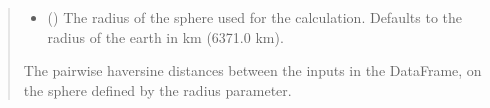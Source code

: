 \documentclass[letterpaper,10pt,english]{sphinxmanual}
\begin{document}
\begin{fulllineitems}
\begin{quote}
\begin{description}
\begin{itemize}
\item {}
\sphinxAtStartPar
{} () \textendash{} The radius of the sphere used for the calculation. Defaults to the
radius of the earth in km (6371.0 km).

\end{itemize}

\sphinxAtStartPar
{} \textendash{} The pairwise haversine distances between the inputs in the DataFrame,
on the sphere defined by the radius parameter.

\sphinxAtStartPar
{}

\end{description}\end{quote}

\end{fulllineitems}

\end{document}
